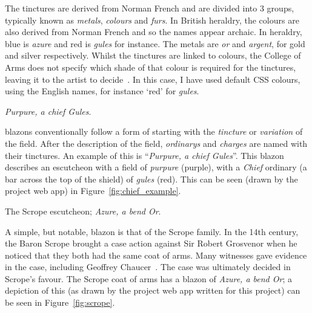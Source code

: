 \documentclass[nobib, a4paper, twoside, justified]{tufte-book}
\makeatletter
\newcommand{\charges}{\glspl{charge}\@\xspace}
\newcommand{\blazon}{\gls{blazon}\@\xspace}
\newcommand{\ublazons}{\Glspl{blazon}\@\xspace}
\makeatother
\begin{document}
The tinctures are derived from Norman French and are divided into 3 groups, typically known as
\textit{metals}, \textit{colours} and \textit{furs}. In British heraldry, the colours are also
derived from Norman French and so the names appear archaic. In heraldry, blue is \textit{azure} and
red is \textit{gules} for instance. The metals are \textit{or} and \textit{argent}, for gold and
silver respectively. Whilst the tinctures are linked to colours, the College of Arms does not
specify which shade of that colour is required for the tinctures, leaving it to the artist to
decide~\autocite{college_of_arms_faq}. In this case, I have used default CSS colours, using the
English names, for instance `red' for \textit{gules}.

\begin{marginfigure}
  \centering
  \def\svgwidth{0.8\linewidth}
  
  \caption{\textit{Purpure, a chief Gules}.}%
  \label{fig:chief_example}
\end{marginfigure}

\ublazons conventionally follow a form of starting with the \textit{\gls{tincture}} or
\textit{\gls{variation}} of the field. After the description of the field,
\textit{\glspl{ordinary}} and \textit{\charges} are named with their tinctures. An example of
this is ``\textit{Purpure, a chief Gules}''. This \blazon describes an escutcheon with a field of
\textit{purpure} (purple), with a \textit{Chief} \gls{ordinary} (a bar across the top of the
shield) of \textit{gules} (red). This can be seen (drawn by the project web app) in
Figure~\ref{fig:chief_example}.

\begin{marginfigure}
  \centering
  \def\svgwidth{0.8\linewidth}
  
  \caption{The Scrope \gls{escutcheon}; \textit{Azure, a bend Or}.}%
  \label{fig:scrope}
\end{marginfigure}

A simple, but notable, \blazon is that of the Scrope family. In the 14th century, the Baron Scrope
brought a case action against Sir Robert Grosvenor when he noticed that they both had the same coat
of arms. Many witnesses gave evidence in the case, including Geoffrey
Chaucer~\autocite{scrope_grosvenor}. The case was ultimately decided in Scrope's favour. The Scrope
coat of arms has a \blazon of \textit{Azure, a bend Or}; a depiction of this (as drawn by the
project web app written for this project) can be seen in Figure~\ref{fig:scrope}.
\end{document}
